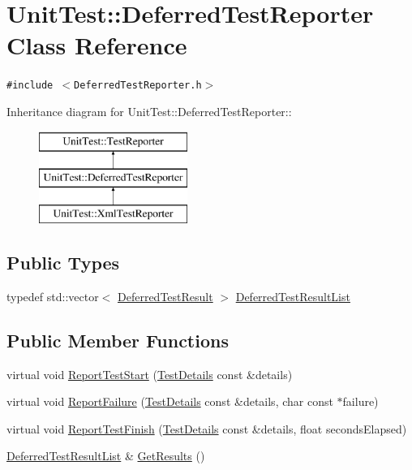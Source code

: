 \hypertarget{class_unit_test_1_1_deferred_test_reporter}{
\section{UnitTest::DeferredTestReporter Class Reference}
\label{class_unit_test_1_1_deferred_test_reporter}
}
{\tt \#include $<$DeferredTestReporter.h$>$}

Inheritance diagram for UnitTest::DeferredTestReporter::\begin{figure}[H]
\begin{center}
\leavevmode
\includegraphics[height=3cm]{class_unit_test_1_1_deferred_test_reporter}
\end{center}
\end{figure}
\subsection*{Public Types}
\begin{CompactItemize}
\item 
typedef std::vector$<$ \hyperlink{struct_unit_test_1_1_deferred_test_result}{DeferredTestResult} $>$ \hyperlink{class_unit_test_1_1_deferred_test_reporter_213b003cf9804c9e99d48d2b25d580bc}{DeferredTestResultList}
\end{CompactItemize}
\subsection*{Public Member Functions}
\begin{CompactItemize}
\item 
virtual void \hyperlink{class_unit_test_1_1_deferred_test_reporter_2aa55cb8b1cb292bbf71078100914d4a}{ReportTestStart} (\hyperlink{class_unit_test_1_1_test_details}{TestDetails} const \&details)
\item 
virtual void \hyperlink{class_unit_test_1_1_deferred_test_reporter_32e8e1e99e3169072d8f49f92f27ed5c}{ReportFailure} (\hyperlink{class_unit_test_1_1_test_details}{TestDetails} const \&details, char const $\ast$failure)
\item 
virtual void \hyperlink{class_unit_test_1_1_deferred_test_reporter_77c9ec008f66a3dc3216e21082ef0215}{ReportTestFinish} (\hyperlink{class_unit_test_1_1_test_details}{TestDetails} const \&details, float secondsElapsed)
\item 
\hyperlink{class_unit_test_1_1_deferred_test_reporter_213b003cf9804c9e99d48d2b25d580bc}{DeferredTestResultList} \& \hyperlink{class_unit_test_1_1_deferred_test_reporter_c52ecee8df771126c5c95c31e1623e47}{GetResults} ()
\end{CompactItemize}


